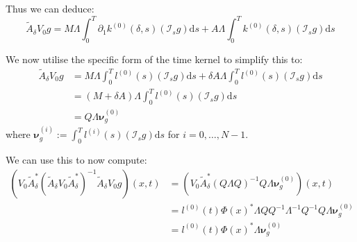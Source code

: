 \documentclass{article}
\theoremstyle{definition}
\theoremstyle{remark}
\theoremstyle{remark}
\begin{document}
\noindent Thus we can deduce:
\begin{equation}
    \tilde{A}_{\delta}V_{0}g=M\Lambda\int_{0}^{T}\partial_{1}k^{(0)}(\delta,s)(\mathcal{I}_{s}g)\mathrm{d}s + A\Lambda\int_{0}^{T}k^{(0)}(\delta,s)(\mathcal{I}_{s}g)\mathrm{d}s
\end{equation}

\noindent We now utilise the specific form of the time kernel to simplify this to:
\begin{align}
    \tilde{A}_{\delta}V_{0}g &= M\Lambda\int_{0}^{T}l^{(0)}(s)(\mathcal{I}_{s}g)\mathrm{d}s + \delta A\Lambda\int_{0}^{T}l^{(0)}(s)(\mathcal{I}_{s}g)\mathrm{d}s \\
    &= (M+\delta A)\Lambda\int_{0}^{T}l^{(0)}(s)(\mathcal{I}_{s}g)\mathrm{d}s \\
    &= Q\Lambda\boldsymbol{\nu}_{g}^{(0)}
\end{align}
where $\boldsymbol{\nu}_{g}^{(i)}:=\int_{0}^{T}l^{(i)}(s)(\mathcal{I}_{s}g)\mathrm{d}s$ for $i=0,\dots,N-1$.

\noindent We can use this to now compute:
\begin{align*}
    (V_{0}\tilde{A}_{\delta}^{*}(\tilde{A}_{\delta}V_{0}\tilde{A}_{\delta}^{*})^{-1}\tilde{A}_{\delta}V_{0}g)(x,t) &=
    (V_{0}\tilde{A}_{\delta}^{*}(Q\Lambda Q)^{-1}Q\Lambda\boldsymbol{\nu}_{g}^{(0)})(x,t) \\
    &=l^{(0)}(t)\Phi(x)^{*}\Lambda Q Q^{-1}\Lambda^{-1}Q^{-1}Q\Lambda\boldsymbol{\nu}_{g}^{(0)} \\
    &=l^{(0)}(t)\Phi(x)^{*}\Lambda\boldsymbol{\nu}_{g}^{(0)}
\end{align*}
\end{document}
